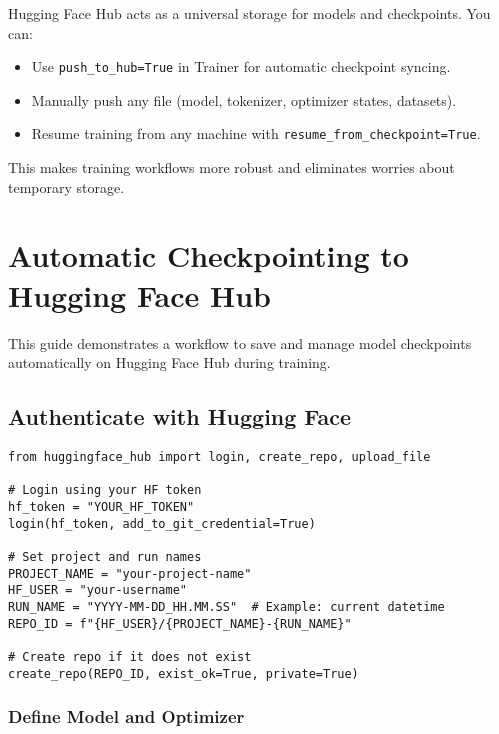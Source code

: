 \begin{tcolorbox}[colback=blue!10!white, colframe=blue!75!black, title=Summary]
Hugging Face Hub acts as a universal storage for models and checkpoints.  
You can:
\begin{itemize}
    \item Use \texttt{push\_to\_hub=True} in Trainer for automatic checkpoint syncing.
    \item Manually push any file (model, tokenizer, optimizer states, datasets).
    \item Resume training from any machine with \texttt{resume\_from\_checkpoint=True}.
\end{itemize}
This makes training workflows more robust and eliminates worries about temporary storage.
\end{tcolorbox}

\newpage
\section{Automatic Checkpointing to Hugging Face Hub}

This guide demonstrates a workflow to save and manage model checkpoints automatically on Hugging Face Hub during training.

\subsection{Authenticate with Hugging Face}

\begin{tcolorbox}[colback=blue!5!white, colframe=blue!75!black, title=Login to Hugging Face]
\begin{verbatim}
from huggingface_hub import login, create_repo, upload_file

# Login using your HF token
hf_token = "YOUR_HF_TOKEN"
login(hf_token, add_to_git_credential=True)

# Set project and run names
PROJECT_NAME = "your-project-name"
HF_USER = "your-username"
RUN_NAME = "YYYY-MM-DD_HH.MM.SS"  # Example: current datetime
REPO_ID = f"{HF_USER}/{PROJECT_NAME}-{RUN_NAME}"

# Create repo if it does not exist
create_repo(REPO_ID, exist_ok=True, private=True)
\end{verbatim}
\end{tcolorbox}

\subsubsection{Define Model and Optimizer}

